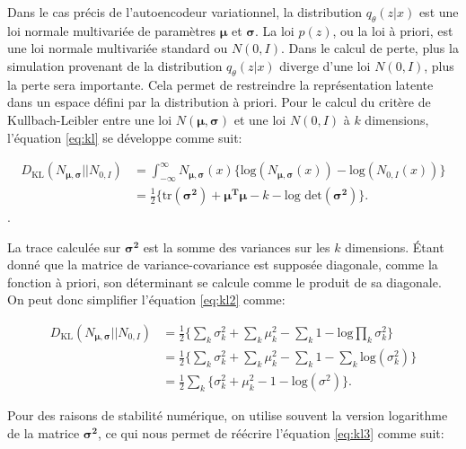 Dans le cas précis de l'autoencodeur variationnel, la distribution $q_{\theta}(z|x)$ est une loi normale multivariée de paramètres $\boldsymbol \mu$ et $\boldsymbol \sigma$. La loi $p(z)$, ou la loi à priori, est une loi normale multivariée standard ou $N(0,I)$. Dans le calcul de perte, plus la simulation provenant de la distribution $q_{\theta}(z|x)$ diverge d'une loi $N(0, I)$, plus la perte sera importante. Cela permet de restreindre la représentation latente dans un espace défini par la distribution à priori. Pour le calcul du critère de Kullbach-Leibler entre une loi $N(\boldsymbol \mu, \boldsymbol \sigma)$ et une loi $N(0, I)$ à $k$ dimensions, l'équation \ref{eq:kl} se développe comme suit:

\begin{equation}  \label{eq:kl2}
	\begin{aligned}
	D_{\text{KL}}(N_{\boldsymbol \mu, \boldsymbol \sigma} || N_{0,I}) &= \int_{-\infty}^{\infty} N_{\boldsymbol \mu, \boldsymbol \sigma}(x) \big\{\text{log}(N_{\boldsymbol \mu,\boldsymbol \sigma}(x)) - \text{log}(N_{0,I}(x))\big\} \\
		&= \frac{1}{2}\big\{\text{tr}(\boldsymbol{\sigma^2}) + \boldsymbol{\mu^T} \boldsymbol{\mu} - k - \text{log det}(\boldsymbol{\sigma^2})\big \}.
 	\end{aligned}
\end{equation}.

La trace calculée sur $\boldsymbol{\sigma^2}$ est la somme des variances sur les $k$ dimensions. Étant donné que la matrice de variance-covariance est supposée diagonale, comme la fonction à priori, son déterminant se calcule comme le produit de sa diagonale. On peut donc simplifier l'équation \ref{eq:kl2} comme:

\begin{equation}  \label{eq:kl3}
\begin{aligned}
D_{\text{KL}}(N_{\boldsymbol \mu, \boldsymbol \sigma} || N_{0,I}) &=  \frac{1}{2}\Big\{\sum_k \sigma_{k}^2+ \sum_{k}\mu_{k}^2 - \sum_{k} 1 - \text{log} \prod_{k}\sigma_{k}^2\Big \} \\
&=\frac{1}{2}\Big\{\sum_k \sigma_{k}^2+ \sum_{k}\mu_{k}^2 - \sum_{k} 1 - \sum_{k} \text{log} (\sigma_{k}^2)\Big \} \\
&=\frac{1}{2} \sum_{k}\Big\{\sigma_{k}^2 + \mu_{k}^2 - 1 - \text{log}(\sigma^2)\Big\}.
\end{aligned}
\end{equation}

Pour des raisons de stabilité numérique, on utilise souvent la version logarithme de la matrice $\boldsymbol{\sigma^2}$, ce qui nous permet de réécrire l'équation \ref{eq:kl3} comme suit:


